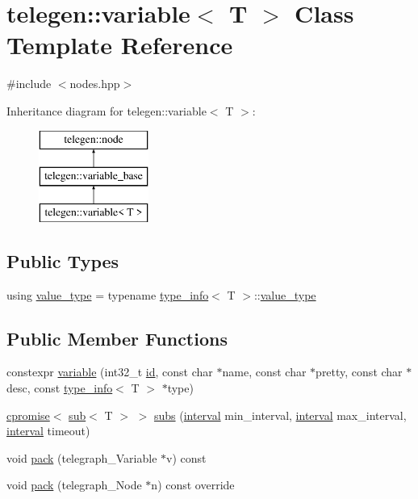 \hypertarget{classtelegen_1_1variable}{}\section{telegen\+:\+:variable$<$ T $>$ Class Template Reference}
\label{classtelegen_1_1variable}


{\ttfamily \#include $<$nodes.\+hpp$>$}

Inheritance diagram for telegen\+:\+:variable$<$ T $>$\+:\begin{figure}[H]
\begin{center}
\leavevmode
\includegraphics[height=3.000000cm]{classtelegen_1_1variable}
\end{center}
\end{figure}
\subsection*{Public Types}
\begin{DoxyCompactItemize}
\item 
using \hyperlink{classtelegen_1_1variable_a5c393a9657a0a4d9287c1269d1eda654}{value\+\_\+type} = typename \hyperlink{structtelegen_1_1type__info}{type\+\_\+info}$<$ T $>$\+::\hyperlink{classtelegen_1_1variable_a5c393a9657a0a4d9287c1269d1eda654}{value\+\_\+type}
\end{DoxyCompactItemize}
\subsection*{Public Member Functions}
\begin{DoxyCompactItemize}
\item 
constexpr \hyperlink{classtelegen_1_1variable_ab4f2caa5cd1b6b9956d86ed567a4ec05}{variable} (int32\+\_\+t \hyperlink{classtelegen_1_1node_aae3ff0d12932c55fdc88a1743e27ea56}{id}, const char $\ast$name, const char $\ast$pretty, const char $\ast$desc, const \hyperlink{structtelegen_1_1type__info}{type\+\_\+info}$<$ T $>$ $\ast$type)
\item 
\hyperlink{namespacetelegen_a73ca2c44e7e302c2405f99a28e35acb7}{cpromise}$<$ \hyperlink{classtelegen_1_1sub}{sub}$<$ T $>$ $>$ \hyperlink{classtelegen_1_1variable_aa742bfaf515df28d57e50ac0dd821ac2}{subs} (\hyperlink{namespacetelegen_ad925de2d0a99bc43918533abf0457344}{interval} min\+\_\+interval, \hyperlink{namespacetelegen_ad925de2d0a99bc43918533abf0457344}{interval} max\+\_\+interval, \hyperlink{namespacetelegen_ad925de2d0a99bc43918533abf0457344}{interval} timeout)
\item 
void \hyperlink{classtelegen_1_1variable_aea48d0a504b5839f544099c402373b43}{pack} (telegraph\+\_\+\+Variable $\ast$v) const
\item 
void \hyperlink{classtelegen_1_1variable_a8a077a32a045a67f049737517be3ea51}{pack} (telegraph\+\_\+\+Node $\ast$n) const override
\end{DoxyCompactItemize}
